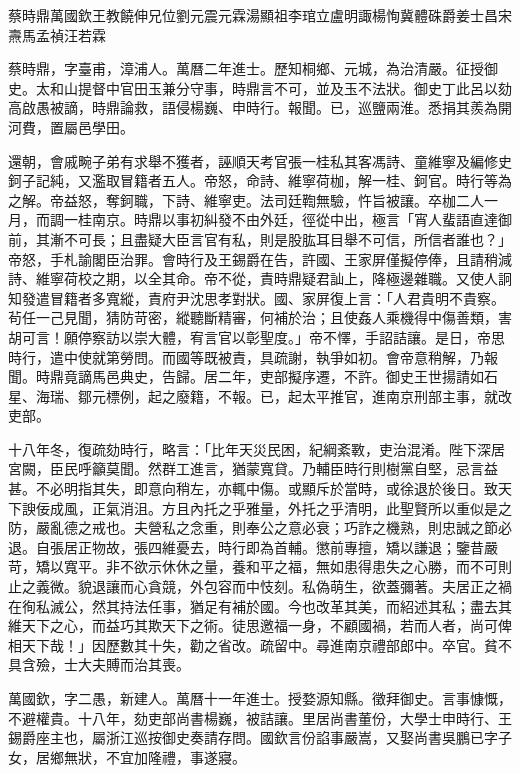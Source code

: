 
\begin{pinyinscope}
蔡時鼎萬國欽王教饒伸兄位劉元震元霖湯顯祖李琯立盧明諏楊恂冀體硃爵姜士昌宋燾馬孟禎汪若霖

蔡時鼎，字臺甫，漳浦人。萬曆二年進士。歷知桐鄉、元城，為治清嚴。征授御史。太和山提督中官田玉兼分守事，時鼎言不可，並及玉不法狀。御史丁此呂以劾高啟愚被謫，時鼎論救，語侵楊巍、申時行。報聞。已，巡鹽兩淮。悉捐其羨為開河費，置屬邑學田。

還朝，會戚畹子弟有求舉不獲者，誣順天考官張一桂私其客馮詩、童維寧及編修史鈳子記純，又濫取冒籍者五人。帝怒，命詩、維寧荷枷，解一桂、鈳官。時行等為之解。帝益怒，奪鈳職，下詩、維寧吏。法司廷鞫無驗，忤旨被讓。卒枷二人一月，而調一桂南京。時鼎以事初糾發不由外廷，徑從中出，極言「宵人蜚語直達御前，其漸不可長；且盡疑大臣言官有私，則是股肱耳目舉不可信，所信者誰也？」帝怒，手札諭閣臣治罪。會時行及王錫爵在告，許國、王家屏僅擬停俸，且請稍減詩、維寧荷校之期，以全其命。帝不從，責時鼎疑君訕上，降極邊雜職。又使人詗知發遣冒籍者多寬縱，責府尹沈思孝對狀。國、家屏復上言：「人君貴明不貴察。茍任一己見聞，猜防苛密，縱聽斷精審，何補於治；且使姦人乘機得中傷善類，害胡可言！願停察訪以崇大體，宥言官以彰聖度。」帝不懌，手詔詰讓。是日，帝思時行，遣中使就第勞問。而國等既被責，具疏謝，執爭如初。會帝意稍解，乃報聞。時鼎竟謫馬邑典史，告歸。居二年，吏部擬序遷，不許。御史王世揚請如石星、海瑞、鄒元標例，起之廢籍，不報。已，起太平推官，進南京刑部主事，就改吏部。

十八年冬，復疏劾時行，略言：「比年天災民困，紀綱紊斁，吏治混淆。陛下深居宮闕，臣民呼籲莫聞。然群工進言，猶蒙寬貸。乃輔臣時行則樹黨自堅，忌言益甚。不必明指其失，即意向稍左，亦輒中傷。或顯斥於當時，或徐退於後日。致天下諛佞成風，正氣消沮。方且內托之乎雅量，外托之乎清明，此聖賢所以重似是之防，嚴亂德之戒也。夫營私之念重，則奉公之意必衰；巧詐之機熟，則忠誠之節必退。自張居正物故，張四維憂去，時行即為首輔。懲前專擅，矯以謙退；鑒昔嚴苛，矯以寬平。非不欲示休休之量，養和平之福，無如患得患失之心勝，而不可則止之義微。貌退讓而心貪競，外包容而中忮刻。私偽萌生，欲蓋彌著。夫居正之禍在徇私滅公，然其持法任事，猶足有補於國。今也改革其美，而紹述其私；盡去其維天下之心，而益巧其欺天下之術。徒思邀福一身，不顧國禍，若而人者，尚可俾相天下哉！」因歷數其十失，勸之省改。疏留中。尋進南京禮部郎中。卒官。貧不具含殮，士大夫賻而治其喪。

萬國欽，字二愚，新建人。萬曆十一年進士。授婺源知縣。徵拜御史。言事慷慨，不避權貴。十八年，劾吏部尚書楊巍，被詰讓。里居尚書董份，大學士申時行、王錫爵座主也，屬浙江巡按御史奏請存問。國欽言份諂事嚴嵩，又娶尚書吳鵬已字子女，居鄉無狀，不宜加隆禮，事遂寢。


\end{pinyinscope}
